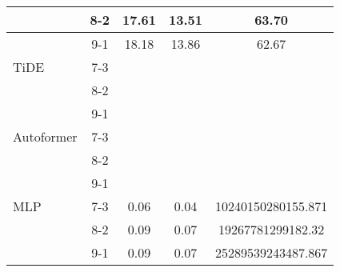 \begin{table}[h!]
\begin{tabular}{|l|c|c|c|c|}
    \rowcolor{white}  & 8-2 & 17.61 & 13.51 & 63.70 \\ \hline
    \rowcolor{white}  & 9-1 & 18.18 & 13.86 & 62.67 \\ \hline
    \rowcolor{green!30} TiDE & 7-3 &  &  &  \\ \hline
    \rowcolor{green!30}  & 8-2 &  &  &  \\ \hline
    \rowcolor{green!30}  & 9-1 &  &  &  \\ \hline
    \rowcolor{white} Autoformer & 7-3 &  &  &  \\ \hline
    \rowcolor{white}  & 8-2 &  &  &  \\ \hline
    \rowcolor{white}  & 9-1 &  &  &  \\ \hline
    \rowcolor{white} MLP & 7-3 & 0.06 & 0.04& 10240150280155.871 \\ \hline
    \rowcolor{white}  & 8-2 & 0.09 & 0.07 & 19267781299182.32 \\ \hline
    \rowcolor{white}  & 9-1 & 0.09 & 0.07& 25289539243487.867  \\ \hline
    \end{tabular}
    \end{table}
